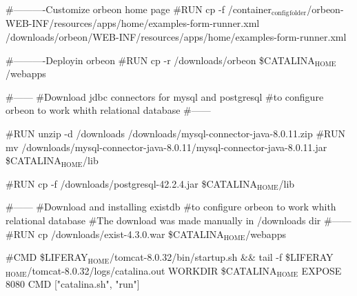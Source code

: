 \documentclass[presentation]{beamer}
\begin{document}
\#----------Customize orbeon home page
\#RUN cp -f /container\(_{\text{config}}\)\(_{\text{folder}}\)/orbeon-WEB-INF/resources/apps/home/examples-form-runner.xml /downloads/orbeon/WEB-INF/resources/apps/home/examples-form-runner.xml


\#----------Deployin orbeon
\#RUN cp -r /downloads/orbeon \$CATALINA\(_{\text{HOME}}\)/webapps




\#------
\#Download jdbc connectors for mysql and postgresql
\#to configure orbeon to work whith relational database
\#------

\#RUN unzip -d /downloads /downloads/mysql-connector-java-8.0.11.zip  
\#RUN mv /downloads/mysql-connector-java-8.0.11/mysql-connector-java-8.0.11.jar  \$CATALINA\(_{\text{HOME}}\)/lib



\#RUN cp -f /downloads/postgresql-42.2.4.jar \$CATALINA\(_{\text{HOME}}\)/lib


\#------
\#Download and installing existdb
\#to configure orbeon to work whith relational database
\#The download was made manually in /downloads dir
\#------
\#RUN cp /downloads/exist-4.3.0.war \$CATALINA\(_{\text{HOME}}\)/webapps





\#CMD \$LIFERAY\(_{\text{HOME}}\)/tomcat-8.0.32/bin/startup.sh \&\& tail -f \$LIFERAY\(_{\text{HOME}}\)/tomcat-8.0.32/logs/catalina.out
WORKDIR \$CATALINA\(_{\text{HOME}}\)
EXPOSE 8080
CMD ["catalina.sh", "run"]
\end{document}

